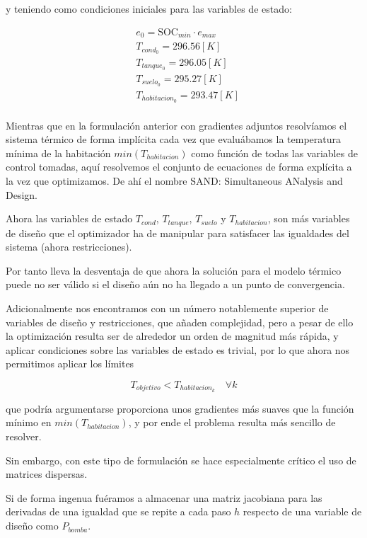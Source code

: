 y teniendo como condiciones iniciales para las variables de estado:

\begin{align}
	 & e_0 = \text{SOC}_{min} \cdot e_{max} \\
	 & T_{cond_0} = 296.56 [K]              \\
	 & T_{tanque_0} = 296.05[K]             \\
	 & T_{suelo_0} = 295.27[K]              \\
	 & T_{habitacion_0} = 293.47[K]         \\
\end{align}


Mientras que en la formulación anterior con gradientes adjuntos resolvíamos el
sistema térmico de forma implícita cada vez que evaluábamos la temperatura
mínima de la habitación $min(T_{habitacion})$ como función de todas las
variables de control tomadas, aquí resolvemos el conjunto de ecuaciones de
forma explícita a la vez que optimizamos. De ahí el nombre SAND: Simultaneous
ANalysis and Design.

Ahora las variables de estado $T_{cond}$, $T_{tanque}$, $T_{suelo}$ y
$T_{habitacion}$, son más variables de diseño que el optimizador ha de
manipular para satisfacer las igualdades del sistema (ahora restricciones).

Por tanto lleva la desventaja de que ahora la solución para el modelo térmico
puede no ser válido si el diseño aún no ha llegado a un punto de convergencia.

Adicionalmente nos encontramos con un número notablemente superior de variables
de diseño y restricciones, que añaden complejidad, pero a pesar de ello la
optimización resulta ser de alrededor un orden de magnitud más rápida, y
aplicar condiciones sobre las variables de estado es trivial, por lo que ahora
nos permitimos aplicar los límites

\begin{equation*}
	T_{objetivo} < T_{habitacion_k} \quad \forall k
\end{equation*}

que podría argumentarse proporciona unos gradientes más suaves que la función
mínimo en $min(T_{habitacion})$, y por ende el problema resulta más sencillo de
resolver.

Sin embargo, con este tipo de formulación se hace especialmente crítico el uso
de matrices dispersas.

Si de forma ingenua fuéramos a almacenar una
matriz jacobiana para las derivadas de una igualdad que se repite a cada paso
$h$ respecto de una variable de diseño como $P_{bomba}$.

